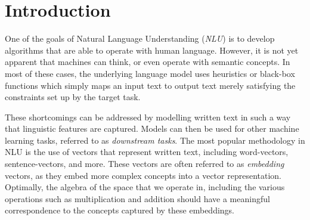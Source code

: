 \documentclass[a4paper,12pt,oneside,openright]{report}
\begin{document}
\pagestyle{fancy}

\fancyhf{}
\fancyhead[L]{\rightmark}
\fancyhead[R]{\thepage}
\renewcommand{\headrulewidth}{0pt}

\singlespacing

\onehalfspacing

\singlespacing


\setcounter{page}{0}
\pagestyle{plain}
\tableofcontents
\listoffigures
\listoftables

\onehalfspacing

\newcommand{\norm}[1]{\left\lVert#1\right\rVert}
\newcommand{\bracket}[1]{\left|#1\right|}
\newcommand{\absdet}[1]{\left|#1\right|}
\newcommand{\bftab}{\fontseries{b}\selectfont}

\newcolumntype{b}{X}


\chapter{Introduction}
\setcounter{page}{1} 

One of the goals of Natural Language Understanding (\textit{NLU}) is to develop algorithms that are able to operate with human language.
However, it is not yet apparent that machines can think, or even operate with semantic concepts.
In most of these cases, the underlying language model uses heuristics or black-box functions which simply maps an input text to output text merely satisfying the constraints set up by the target task.

 
These shortcomings can be addressed by modelling written text in such a way that linguistic features are captured.
Models can then be used for other machine learning tasks, referred to as \textit{downstream tasks}.
The most popular methodology in NLU is the use of vectors that represent written text, including word-vectors, sentence-vectors, and more. 
These vectors are often referred to as \textit{embedding} vectors, as they embed more complex concepts into a vector representation.
Optimally, the algebra of the space that we operate in, including the various operations such as multiplication and addition should have a meaningful correspondence to the concepts captured by these embeddings.
\\
\end{document}
